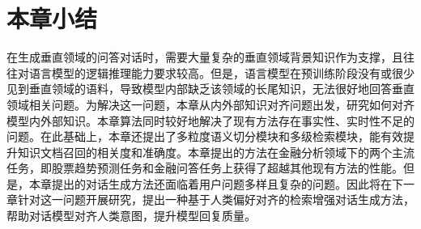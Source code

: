 \section{本章小结}

在生成垂直领域的问答对话时，需要大量复杂的垂直领域背景知识作为支撑，且往往对语言模型的逻辑推理能力要求较高。但是，语言模型在预训练阶段没有或很少见到垂直领域的语料，导致模型内部缺乏该领域的长尾知识，无法很好地回答垂直领域相关问题。为解决这一问题，本章从内外部知识对齐问题出发，研究如何对齐模型内外部知识。本章算法同时较好地解决了现有方法存在事实性、实时性不足的问题。在此基础上，本章还提出了多粒度语义切分模块和多级检索模块，能有效提升知识文档召回的相关度和准确度。本章提出的方法在金融分析领域下的两个主流任务，即股票趋势预测任务和金融问答任务上获得了超越其他现有方法的性能。但是，本章提出的对话生成方法还面临着用户问题多样且复杂的问题。因此将在下一章针对这一问题开展研究，提出一种基于人类偏好对齐的检索增强对话生成方法，帮助对话模型对齐人类意图，提升模型回复质量。